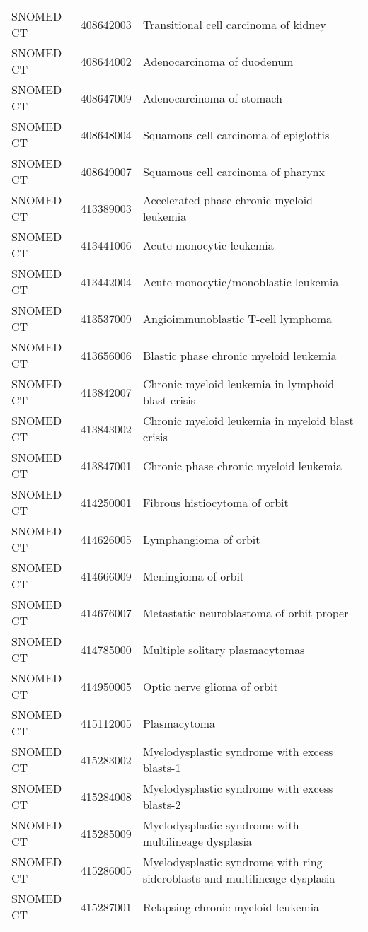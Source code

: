 \begin{longtable}{p{}p{}p{}}
  SNOMED CT & 408642003 & Transitional cell carcinoma of kidney \\ 
  SNOMED CT & 408644002 & Adenocarcinoma of duodenum \\ 
  SNOMED CT & 408647009 & Adenocarcinoma of stomach \\ 
  SNOMED CT & 408648004 & Squamous cell carcinoma of epiglottis \\ 
  SNOMED CT & 408649007 & Squamous cell carcinoma of pharynx \\ 
  SNOMED CT & 413389003 & Accelerated phase chronic myeloid leukemia \\ 
  SNOMED CT & 413441006 & Acute monocytic leukemia \\ 
  SNOMED CT & 413442004 & Acute monocytic/monoblastic leukemia \\ 
  SNOMED CT & 413537009 & Angioimmunoblastic T-cell lymphoma \\ 
  SNOMED CT & 413656006 & Blastic phase chronic myeloid leukemia \\ 
  SNOMED CT & 413842007 & Chronic myeloid leukemia in lymphoid blast crisis \\ 
  SNOMED CT & 413843002 & Chronic myeloid leukemia in myeloid blast crisis \\ 
  SNOMED CT & 413847001 & Chronic phase chronic myeloid leukemia \\ 
  SNOMED CT & 414250001 & Fibrous histiocytoma of orbit \\ 
  SNOMED CT & 414626005 & Lymphangioma of orbit \\ 
  SNOMED CT & 414666009 & Meningioma of orbit \\ 
  SNOMED CT & 414676007 & Metastatic neuroblastoma of orbit proper \\ 
  SNOMED CT & 414785000 & Multiple solitary plasmacytomas \\ 
  SNOMED CT & 414950005 & Optic nerve glioma of orbit \\ 
  SNOMED CT & 415112005 & Plasmacytoma \\ 
  SNOMED CT & 415283002 & Myelodysplastic syndrome with excess blasts-1 \\ 
  SNOMED CT & 415284008 & Myelodysplastic syndrome with excess blasts-2 \\ 
  SNOMED CT & 415285009 & Myelodysplastic syndrome with multilineage dysplasia \\ 
  SNOMED CT & 415286005 & Myelodysplastic syndrome with ring sideroblasts and multilineage dysplasia \\ 
  SNOMED CT & 415287001 & Relapsing chronic myeloid leukemia \\ 

\end{longtable}
